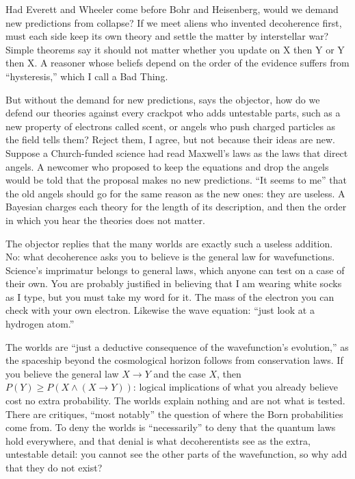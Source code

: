 Had Everett and Wheeler come before Bohr and Heisenberg, would we demand new predictions from collapse? If we meet aliens who invented decoherence first, must each side keep its own theory and settle the matter by interstellar war? Simple theorems say it should not matter whether you update on X then Y or Y then X. A reasoner whose beliefs depend on the order of the evidence suffers from ``hysteresis,'' which I call a Bad Thing. 

But without the demand for new predictions, says the objector, how do we defend our theories against every crackpot who adds untestable parts, such as a new property of electrons called scent, or angels who push charged particles as the field tells them? Reject them, I agree, but not because their ideas are new. Suppose a Church-funded science had read Maxwell's laws as the laws that direct angels. A newcomer who proposed to keep the equations and drop the angels would be told that the proposal makes no new predictions. ``It seems to me'' that the old angels should go for the same reason as the new ones: they are useless. A Bayesian charges each theory for the length of its description, and then the order in which you hear the theories does not matter.

The objector replies that the many worlds are exactly such a useless addition. No: what decoherence asks you to believe is the general law for wavefunctions. Science's imprimatur belongs to general laws, which anyone can test on a case of their own. You are probably justified in believing that I am wearing white socks as I type, but you must take my word for it. The mass of the electron you can check with your own electron. Likewise the wave equation: ``just look at a hydrogen atom.'' 

The worlds are ``just a deductive consequence of the wavefunction's evolution,'' as the spaceship beyond the cosmological horizon follows from conservation laws. If you believe the general law $X \to Y$ and the case $X$, then $P(Y) \ge P(X \wedge (X \to Y))$: logical implications of what you already believe cost no extra probability. The worlds explain nothing and are not what is tested. There are critiques, ``most notably'' the question of where the Born probabilities come from.  To deny the worlds is ``necessarily'' to deny that the quantum laws hold everywhere, and that denial is what decoherentists see as the extra, untestable detail: you cannot see the other parts of the wavefunction, so why add that they do not exist? 

